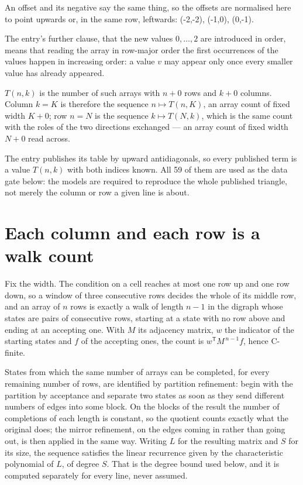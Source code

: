 \documentclass[11pt]{article}
\theoremstyle{definition}
\begin{document}
An offset and its negative say the same thing, so the offsets are normalised here to point upwards or, in the same row, leftwards: (-2,-2), (-1,0), (0,-1).

The entry's further clause, that the new values $0,\dots,2$ are introduced in order, means that reading the array in row-major order the first occurrences of the values happen in increasing order: a value $v$ may appear only once every smaller value has already appeared.

$T(n,k)$ is the number of such arrays with $n + 0$ rows and $k + 0$ columns. Column $k = K$ is therefore the sequence $n \mapsto T(n,K)$, an array count of fixed width $K + 0$; row $n = N$ is the sequence $k \mapsto T(N,k)$, which is the same count with the roles of the two directions exchanged --- an array count of fixed width $N + 0$ read across.

The entry publishes its table by upward antidiagonals, so every published term is a value $T(n,k)$ with both indices known. All 59 of them are used as the data gate below: the models are required to reproduce the whole published triangle, not merely the column or row a given line is about.

\section{Each column and each row is a walk count}

Fix the width. The condition on a cell reaches at most one row up and one row down, so a window of three consecutive rows decides the whole of its middle row, and an array of $n$ rows is exactly a walk of length $n-1$ in the digraph whose states are pairs of consecutive rows, starting at a state with no row above and ending at an accepting one. With $M$ its adjacency matrix, $w$ the indicator of the starting states and $f$ of the accepting ones, the count is $w^{\mathsf T}M^{\,n-1}f$, hence C-finite.

States from which the same number of arrays can be completed, for every remaining number of rows, are identified by partition refinement: begin with the partition by acceptance and separate two states as soon as they send different numbers of edges into some block. On the blocks of the result the number of completions of each length is constant, so the quotient counts exactly what the original does; the mirror refinement, on the edges coming in rather than going out, is then applied in the same way. Writing $L$ for the resulting matrix and $S$ for its size, the sequence satisfies the linear recurrence given by the characteristic polynomial of $L$, of degree $S$. That is the degree bound used below, and it is computed separately for every line, never assumed.
\end{document}
